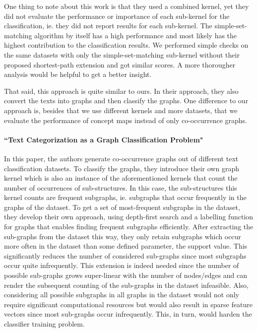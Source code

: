 One thing to note about this work is that they used a combined kernel, yet they did not evaluate the performance or importance of each sub-kernel for the classification, ie. they did not report results for each sub-kernel.
The simple-set-matching algorithm by itself has a high performance and most likely has the highest contribution to the classification results. We performed simple checks on the same datasets with only the simple-set-matching sub-kernel without their proposed shortest-path extension and got similar scores.
A more thorougher analysis would be helpful to get a better insight.

That said, this approach is quite similar to ours. In their approach, they also convert the texts into graphs and then classify the graphs. One difference to our approach is, besides that we use different kernels and more datasets, that we evaluate the performance of concept maps instead of only co-occurrence graphs.

\paragraph{``Text Categorization as a Graph Classification Problem" \cite{Rousseau2015a}}
In this paper, the authors generate co-occurrence graphs out of different text classification datasets.
To classify the graphs, they introduce their own graph kernel which is also an instance of the aforementioned kernels that count the number of occurrences of sub-structures.
In this case, the sub-structures this kernel counts are frequent subgraphs, ie. subgraphs that occur frequently in the graphs of the dataset.
To get a set of most-frequent subgraphs in the dataset, they develop their own approach, using depth-first search and a labelling function for graphs that enables finding frequent subgraphs efficiently.
After extracting the sub-graphs from the dataset this way, they only retain subgraphs which occur more often in the dataset than some defined parameter, the support value.
This significantly reduces the number of considered sub-graphs since most subgraphs occur quite infrequently.
This extension is indeed needed since the number of possible sub-graphs grows super-linear with the number of nodes/edges and can render the subsequent counting of the sub-graphs in the dataset infeasible.
Also, considering all possible subgraphs in all graphs in the dataset would not only require significant computational resources but would also result in sparse feature vectors since most sub-graphs occur infrequently.
This, in turn, would harden the classifier training problem.

